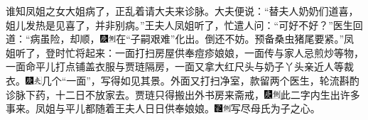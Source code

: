 {谁知凤姐之女大姐病了，正乱着请大夫来诊脉。大夫便说：“替夫人奶奶们道喜，姐儿发热是见喜了，并非别病。”王夫人凤姐听了，忙遣人问：“可好不好？”医生回道：“病虽险，却顺，{\includegraphics[width=3mm]{../Images/00004}\includegraphics[width=3mm]{../Images/00011}\footnotesize \kaishu 在“子嗣艰难”化出。}倒还不妨。预备桑虫猪尾要紧。”凤姐听了，登时忙将起来：一面打扫房屋供奉痘疹娘娘，一面传与家人忌煎炒等物，一面命平儿打点铺盖衣服与贾琏隔房，一面又拿大红尺头与奶子丫头亲近人等裁衣。{\includegraphics[width=3mm]{../Images/00004}\includegraphics[width=3mm]{../Images/00012}\footnotesize \kaishu 几个“一面”，写得如见其景。}外面又打扫净室，款留两个医生，轮流斟酌诊脉下药，十二日不放家去。贾琏只得搬出外书房来斋戒，{\includegraphics[width=3mm]{../Images/00004}\includegraphics[width=3mm]{../Images/00011}\footnotesize \kaishu 此二字内生出许多事来。}凤姐与平儿都随着王夫人日日供奉娘娘。{\includegraphics[width=3mm]{../Images/00006}\includegraphics[width=3mm]{../Images/00011}\footnotesize \kaishu 写尽母氏为子之心。}

}
